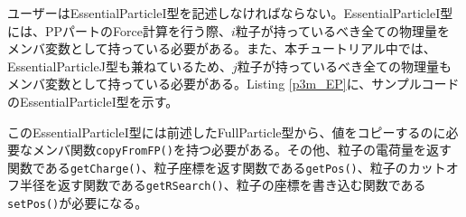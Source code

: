 ユーザーはEssentialParticleI型を記述しなければならない。EssentialParticleI型には、PPパートのForce計算を行う際、$i$粒子が持っているべき全ての物理量をメンバ変数として持っている必要がある。また、本チュートリアル中では、EssentialParticleJ型も兼ねているため、$j$粒子が持っているべき全ての物理量もメンバ変数として持っている必要がある。Listing \ref{p3m_EP}に、サンプルコードのEssentialParticleI型を示す。

\ifCpp %
このEssentialParticleI型には前述したFullParticle型から、値をコピーするのに必要なメンバ関数\texttt{copyFromFP()}を持つ必要がある。その他、粒子の電荷量を返す関数である\texttt{getCharge()}、粒子座標を返す関数である\texttt{getPos()}、粒子のカットオフ半径を返す関数である\texttt{getRSearch()}、粒子の座標を書き込む関数である\texttt{setPos()}が必要になる。
\endifCpp

\ifCpp %

\endifCpp
\ifFtn %

\endifFtn
\ifC %

\endifC

